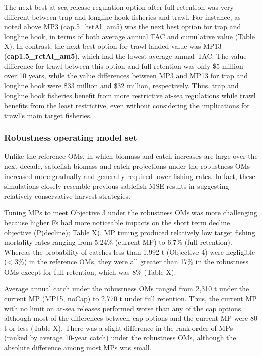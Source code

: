 \documentclass[11pt]{book}
\begin{document}
The next best at-sea release regulation option after full retention was very different between trap and longline hook fisheries and trawl. For instance, as noted above MP3 (cap.5\_hstAl\_am5) was the next best option for trap and longline hook, in terms of both average annual TAC and cumulative value (Table X). In contrast, the next best option for trawl landed value was MP13 (\textbf{cap1.5\_rctAl\_am5}), which had the lowest average annual TAC. The value difference for trawl between this option and full retention was only \$5 million over 10 years, while the value differences between MP3 and MP13 for trap and longline hook were \$33 million and \$32 million, respectively. Thus, trap and longline hook fisheries benefit from more restrictive at-sea regulations while trawl benefits from the least restrictive, even without considering the implications for trawl's main target fisheries.

\hypertarget{robustness-operating-model-set}{%
\subsubsection{Robustness operating model set}\label{robustness-operating-model-set}}

Unlike the reference OMs, in which biomass and catch increases are large over the next decade, sablefish biomass and catch projections under the robustness OMs increased more gradually and generally required lower fishing rates. In fact, these simulations closely resemble previous sablefish MSE results in suggesting relatively conservative harvest strategies.

Tuning MPs to meet Objective 3 under the robustness OMs was more challenging because higher Fs had more noticeable impacts on the short term decline objective (P(decline); Table X). MP tuning produced relatively low target fishing mortality rates ranging from 5.24\% (current MP) to 6.7\% (full retention). Whereas the probability of catches less than 1,992 t (Objective 4) were negligible (\textless{} 3\%) in the reference OMs, they were all greater than 17\% in the robustness OMs except for full retention, which was 8\% (Table X).

Average annual catch under the robustness OMs ranged from 2,310 t under the current MP (MP15, noCap) to 2,770 t under full retention. Thus, the current MP with no limit on at-sea releases performed worse than any of the cap options, although most of the differences between cap options and the current MP were 80 t or less (Table X). There was a slight difference in the rank order of MPs (ranked by average 10-year catch) under the robustness OMs, although the absolute difference among most MPs was small.
\end{document}
